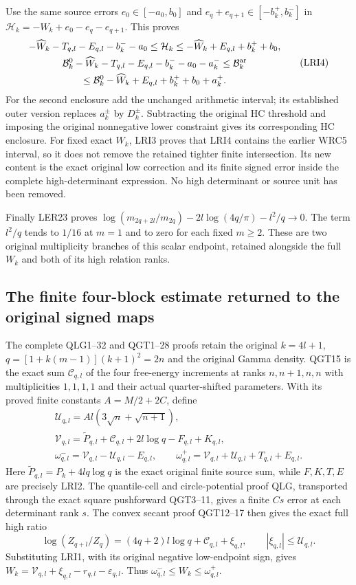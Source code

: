 Use the same source errors $e_0\in[-a_0,b_0]$ and
$e_q+e_{q+1}\in[-b_k^+,b_k^-]$ in
$\mathcal H_k=-W_k+e_0-e_q-e_{q+1}$. This proves
\[
\begin{gathered}
 -\widehat W_k-T_{q,l}-E_{q,l}-b_k^--a_0
 \leq\mathcal H_k
 \leq-\widehat W_k+E_{q,l}+b_k^++b_0,\\
 \mathcal B_k^0-\widehat W_k-T_{q,l}-E_{q,l}-b_k^--a_0-a_k^-
 \leq\mathcal B_k^{\rm ar}\\
 \leq\mathcal B_k^0-\widehat W_k+E_{q,l}+b_k^++b_0+a_k^+.
\end{gathered}\tag{LRI4}
\]
For the second enclosure add the unchanged arithmetic interval;
its established outer version replaces $a_k^\pm$ by $D_k^\pm$.
Subtracting the original HC threshold and imposing the original
nonnegative lower constraint gives its corresponding HC enclosure.
For fixed exact $W_k$, LRI3 proves that LRI4 contains the earlier
WRC5 interval, so it does not remove the retained tighter finite
intersection. Its new content is the exact original low correction
and its finite signed error inside the complete high-determinant
expression. No high determinant or source unit has been removed.

Finally LER23 proves
$\log(m_{2q+2l}/m_{2q})-2l\log(4q/\pi)-l^2/q\to0$.
The term $l^2/q$ tends to $1/16$ at $m=1$ and to zero for
each fixed $m\geq2$. These are two original multiplicity
branches of this scalar endpoint, retained alongside the full
$W_k$ and both of its high relation ranks.


\subsection{The finite four-block estimate returned to the original signed maps}

The complete QLG1--32 and QGT1--28 proofs retain the original
$k=4l+1$, $q=[1+k(m-1)](k+1)^2=2n$ and the original Gamma
density. QGT15 is the exact sum $\mathcal C_{q,l}$ of the four
free-energy increments at ranks $n,n+1,n,n$ with multiplicities
$1,1,1,1$ and their actual quarter-shifted parameters. With its
proved finite constants $A=M/2+2C$, define
\[
\begin{gathered}
 \mathcal U_{q,l}=Al(3\sqrt n+\sqrt{n+1}),\\
 \mathcal V_{q,l}=\widetilde P_{q,l}+\mathcal C_{q,l}
                         +2l\log q-F_{q,l}+K_{q,l},\\
 \omega_{q,l}^-=\mathcal V_{q,l}-\mathcal U_{q,l}-E_{q,l},
 \qquad
 \omega_{q,l}^+=\mathcal V_{q,l}
                        +\mathcal U_{q,l}+T_{q,l}+E_{q,l}.
\end{gathered}\tag{QRI1}
\]
Here $\widetilde P_{q,l}=P_k+4lq\log q$ is the exact original
finite source sum, while $F,K,T,E$ are precisely LRI2. The
quantile-cell and circle-potential proof QLG, transported through
the exact square pushforward QGT3--11, gives a finite $Cs$ error
at each determinant rank $s$. The convex secant proof QGT12--17
then gives the exact full high ratio
\[
 \log(Z_{q+l}/Z_q)=(4q+2)l\log q+\mathcal C_{q,l}+\xi_{q,l},
 \qquad |\xi_{q,l}|\le\mathcal U_{q,l}.
\]
Substituting LRI1, with its original negative low-endpoint sign,
gives
$W_k=\mathcal V_{q,l}+\xi_{q,l}-r_{q,l}-\varepsilon_{q,l}$.
Thus $\omega_{q,l}^-\le W_k\le\omega_{q,l}^+$.

